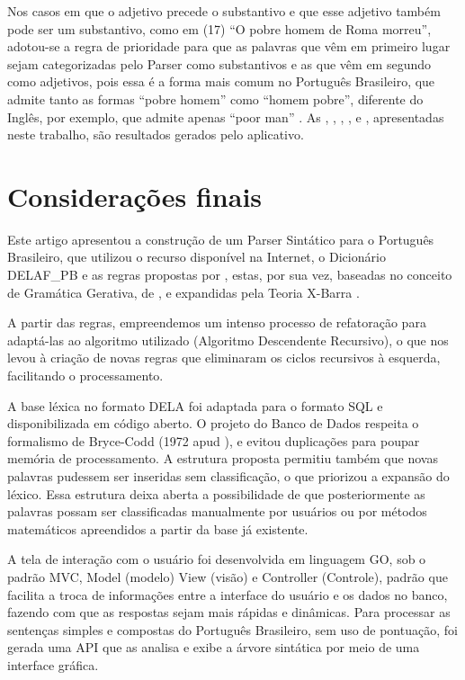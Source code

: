 \documentclass[portuguese]{textolivre}
\begin{document}
Nos casos em que o adjetivo precede o substantivo e que esse adjetivo também pode ser um substantivo, como em (17) “O pobre homem de Roma morreu”, adotou-se a regra de prioridade para que as palavras que vêm em primeiro lugar sejam categorizadas pelo Parser como substantivos e as que vêm em segundo como adjetivos, pois essa é a forma mais comum no Português Brasileiro, que admite tanto as formas “pobre homem” como “homem pobre”, diferente do Inglês, por exemplo, que admite apenas “poor man” . As , , , ,  e , apresentadas neste trabalho, são resultados gerados pelo aplicativo.

\section{Considerações finais}\label{sec-modelo}
Este artigo apresentou a construção de um Parser Sintático para o Português Brasileiro, que utilizou o recurso disponível na Internet, o Dicionário DELAF\_PB \cite{muniz_construcao_2004} e as regras propostas por \textcite[p. 142]{othero_gramatica_2009}, estas, por sua vez, baseadas no conceito de Gramática Gerativa, de \textcite{chomsky_estruturas_2015}, e expandidas pela Teoria X-Barra \cite{chomsky__2014,othero_gramatica_2009}. 

A partir das regras, empreendemos um intenso processo de refatoração para adaptá-las ao algoritmo utilizado (Algoritmo Descendente Recursivo), o que nos levou à criação de novas regras que eliminaram os ciclos recursivos à esquerda, facilitando o processamento. 

A base léxica no formato DELA foi adaptada para o formato SQL e disponibilizada em código aberto. O projeto do Banco de Dados respeita o formalismo de Bryce-Codd (1972 apud \cite[p. 75]{lake_concise_2013}),  
e evitou duplicações para poupar memória de processamento. A estrutura proposta permitiu também que novas palavras pudessem ser inseridas sem classificação, o que priorizou a expansão do léxico. Essa estrutura deixa aberta a possibilidade de que posteriormente as palavras possam ser classificadas manualmente por usuários ou por métodos matemáticos apreendidos a partir da base já existente. 

A tela de interação com o usuário foi desenvolvida em linguagem GO, sob o padrão MVC, Model (modelo) View (visão) e Controller (Controle), padrão que facilita a troca de informações entre a interface do usuário e os dados no banco, fazendo com que as respostas sejam mais rápidas e dinâmicas. Para processar as sentenças simples e compostas do Português Brasileiro, sem uso de pontuação, foi gerada uma API que as analisa e exibe a árvore sintática por meio de uma interface gráfica.
\end{document}
